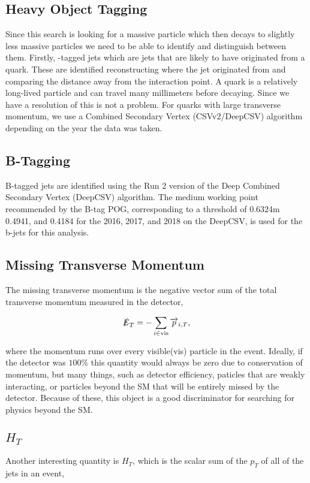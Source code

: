 \subsection{Heavy Object Tagging}\label{HeavyObject}
Since this search is looking for a massive particle which then decays to slightly less massive particles we need to be able to identify and distinguish between them. Firstly, \bquark-tagged jets which are jets that are likely to have originated from a \bquark quark. These are identified reconstructing where the jet originated from and comparing the distance away from the interaction point. A \bquark quark is a relatively long-lived particle and can travel many millimeters before decaying. Since we have a resolution of \mum this is not a problem. For \bquark quarks with large transverse momentum, we use a Combined Secondary Vertex (CSVv2/DeepCSV) algorithm depending on the year the data was taken. 

\subsection{B-Tagging}\label{Btagging}
B-tagged jets are identified using the Run 2 version of the Deep Combined Secondary Vertex (DeepCSV) algorithm. The medium working point recommended by the B-tag POG, corresponding to a threshold of 0.6324m 0.4941, and 0.4184 for the 2016, 2017, and 2018 on the DeepCSV, is used for the b-jets for this analysis.

\subsection{Missing Transverse Momentum}\label{MET}
The missing transverse momentum is the negative vector sum of the total transverse momentum measured in the detector,

\begin{equation}
\slashed{E}_{T}=-\sum_{i\in\text{vis}}\overrightarrow{p}_{i, T},
\end{equation}

where the momentum runs over every visible(vis) particle in the event. Ideally, if the detector was $100\%$ this quantity would always be zero due to conservation of momentum, but many things, such as detector efficiency, paticles that are weakly interacting, or particles beyond the SM that will be entirely missed by the detector. Because of these, this object is a good discriminator for searching for physics beyond the SM. 

\subsection{$H_T$}\label{HT}
Another interesting quantity is $H_T$, which is the scalar sum of the $p_T$ of all of the jets in an event,

